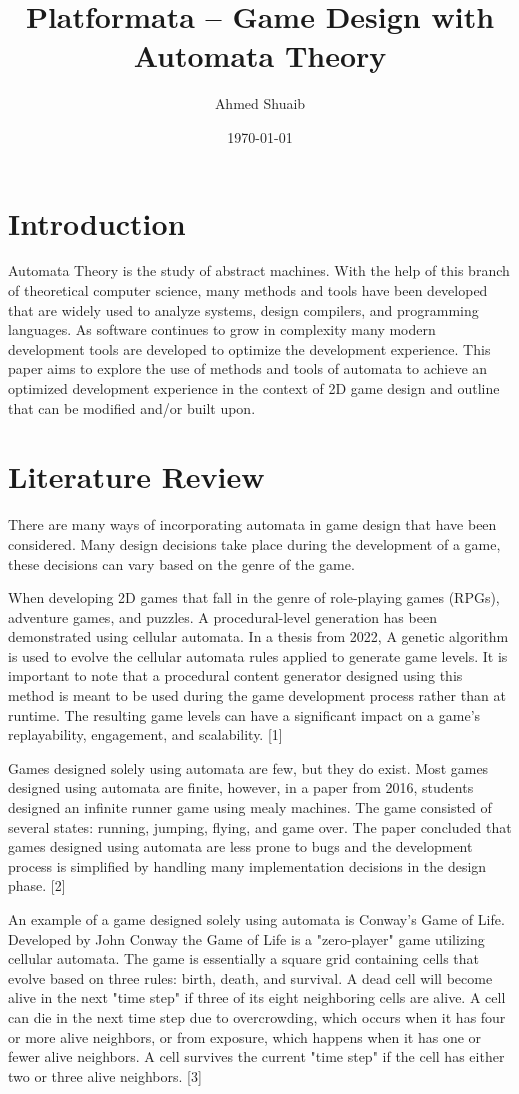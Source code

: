 \documentclass[10pt,twocolumn]{article}
\title{\vspace{-0.4in}\huge{Platformata -- Game Design with Automata Theory}}
\author{Ahmed Shuaib}
\date{\today}
\begin{document}
\maketitle
\vspace{-0.4in}

\section*{Introduction}
Automata Theory is the study of abstract machines. With the help of this branch of theoretical computer science, many methods and tools have been developed that are widely used to analyze systems, design compilers, and programming languages. As software continues to grow in complexity many modern development tools are developed to optimize the development experience. This paper aims to explore the use of methods and tools of automata to achieve an optimized development experience in the context of 2D game design and outline that can be modified and/or built upon.

\section*{Literature Review}
There are many ways of incorporating automata in game design that have been considered. Many design decisions take place during the development of a game, these decisions can vary based on the genre of the game.
\par
When developing 2D games that fall in the genre of role-playing games (RPGs), adventure games, and puzzles. A procedural-level generation has been demonstrated using cellular automata. In a thesis from 2022, A genetic algorithm is used to evolve the cellular automata rules applied to generate game levels. It is important to note that a procedural content generator designed using this method is meant to be used during the game development process rather than at runtime. The resulting game levels can have a significant impact on a game's replayability, engagement, and scalability. [1]
\par
Games designed solely using automata are few, but they do exist. Most games designed using automata are finite, however, in a paper from 2016, students designed an infinite runner game using mealy machines. The game consisted of several states: running, jumping, flying, and game over. The paper concluded that games designed using automata are less prone to bugs and the development process is simplified by handling many implementation decisions in the design phase. [2]
\par
An example of a game designed solely using automata is Conway's Game of Life. Developed by John Conway the Game of Life is a "zero-player" game utilizing cellular automata. The game is essentially a square grid containing cells that evolve based on three rules: birth, death, and survival. A dead cell will become alive in the next "time step" if three of its eight neighboring cells are alive. A cell can die in the next time step due to overcrowding, which occurs when it has four or more alive neighbors, or from exposure, which happens when it has one or fewer alive neighbors. A cell survives the current "time step" if the cell has either two or three alive neighbors. [3]
\end{document}
